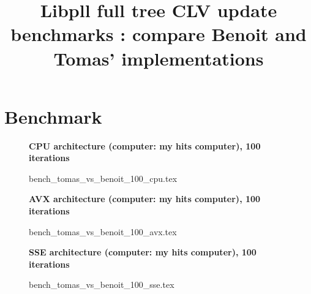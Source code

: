 \documentclass[a4paper]{article}
\begin{document}
\newcommand*{\figuretitle}[1]{%
    {\centering%
    \textbf{#1}%
    \par\medskip}%
}


\title{Libpll full tree CLV update benchmarks : compare Benoit and Tomas' implementations}
\maketitle



\section{Benchmark}


\begin{figure}[!htb]
\figuretitle{CPU architecture (computer: my hits computer), 100 iterations}
{bench_tomas_vs_benoit_100_cpu.tex}
\end{figure}

\begin{figure}[!htb]
\figuretitle{AVX architecture (computer: my hits computer), 100 iterations}
{bench_tomas_vs_benoit_100_avx.tex}
\end{figure}

\begin{figure}[!htb]
\figuretitle{SSE architecture (computer: my hits computer), 100 iterations}
{bench_tomas_vs_benoit_100_sse.tex}
\end{figure}
\end{document}
